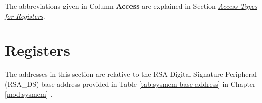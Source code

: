 \documentclass[main\_\_EN.tex]{subfiles}
\begin{document}
The abbreviations given in Column \textbf{Access} are explained in Section \hyperref[glossary-access-types]{\textit{Access Types for Registers}}.






\newpage
\section{Registers}

The addresses in this section are relative to the RSA Digital Signature Peripheral (RSA\_DS) base address provided in Table \ref{tab:sysmem-base-address} in Chapter \ref{mod:sysmem} \textit{}.


\end{document}
